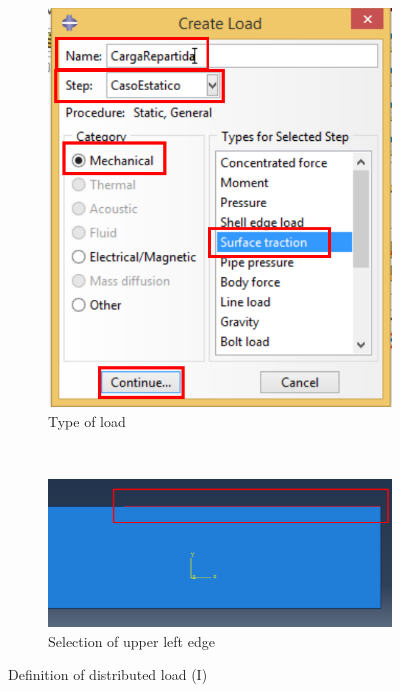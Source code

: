 \begin{enumerate}
\begin{figure}[H]
\begin{subfigure}{0.30\textwidth}
      \includegraphics[width=\textwidth]{./body/images/imagen44.pdf}
      \caption{Type of load}
      \label{figu44}
    \end{subfigure}%
    ~ %
    \begin{subfigure}{0.44\textwidth}
      \includegraphics[width=\textwidth]{./body/images/imagen45.pdf}
      \caption{Selection of upper left edge}
      \label{figu45}
    \end{subfigure}%
    \caption{Definition of distributed load (I)}

\end{figure}
\end{enumerate}
